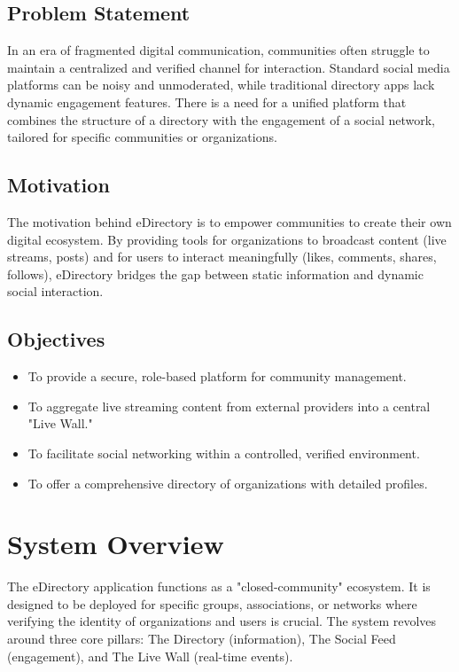 \documentclass[12pt, a4paper]{report}
\begin{document}
\section{Problem Statement}
In an era of fragmented digital communication, communities often struggle to maintain a centralized and verified channel for interaction. Standard social media platforms can be noisy and unmoderated, while traditional directory apps lack dynamic engagement features. There is a need for a unified platform that combines the structure of a directory with the engagement of a social network, tailored for specific communities or organizations.

\section{Motivation}
The motivation behind eDirectory is to empower communities to create their own digital ecosystem. By providing tools for organizations to broadcast content (live streams, posts) and for users to interact meaningfully (likes, comments, shares, follows), eDirectory bridges the gap between static information and dynamic social interaction.

\section{Objectives}
\begin{itemize}
    \item To provide a secure, role-based platform for community management.
    \item To aggregate live streaming content from external providers into a central "Live Wall."
    \item To facilitate social networking within a controlled, verified environment.
    \item To offer a comprehensive directory of organizations with detailed profiles.
\end{itemize}

\chapter{System Overview}
The eDirectory application functions as a "closed-community" ecosystem. It is designed to be deployed for specific groups, associations, or networks where verifying the identity of organizations and users is crucial. The system revolves around three core pillars: The Directory (information), The Social Feed (engagement), and The Live Wall (real-time events).
\end{document}
